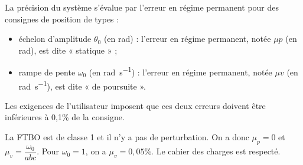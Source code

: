 \ifprof
\else
 La précision du système s’évalue par l’erreur en régime permanent pour des consignes de position de types :
 \begin{itemize}
 \item échelon d’amplitude $\theta_0$ (en \si{rad}) : l’erreur en régime permanent, notée $\mu p$ (en rad), est dite « statique » ;
\item rampe de pente $\omega_0$ (en \si{rad.s^{-1}}) : l’erreur en régime permanent, notée $\mu v$ (en \si{rad.s^{-1}}), est dite « de poursuite ».
\end{itemize}
Les exigences de l’utilisateur imposent que ces deux erreurs doivent être inférieures à 0,1\% de la consigne.
\fi

\ifprof
\begin{corrige}
La FTBO est de classe 1 et il n'y a pas de perturbation. On a donc $\mu_p = 0 $ et $\mu_v = \dfrac{\omega_0}{abc}$. Pour $\omega_0 =1$, on a $\mu_v =0,05\%$.
Le cahier des charges est respecté.
\end{corrige}
\else
\fi
%

